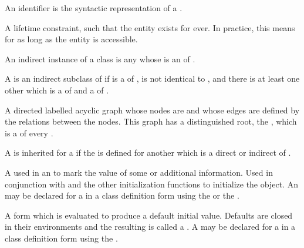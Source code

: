 \begin{optDefinition}
\begin{definitions}
     An identifier is the
    syntactic representation of a .

     A lifetime
    constraint, such that the entity exists for ever.  In practice, this means
    for as long as the entity is accessible.

     An indirect instance of a
    class  is any  whose  is an
      of .

     A  is an
    indirect subclass of  if  is a 
    of ,  is not identical to , and
    there is at least one other  which is a  of
     and a  of .

      A directed
    labelled acyclic graph whose nodes are  and whose edges are
    defined by the  relations between the nodes.  This
    graph has a distinguished root, the  , which is
    a  of every .

     A   is inherited for a
     if the   is defined for another
     which is a direct or indirect  of
    .

      A  used in an
     to mark the value of some  or additional
    information.  Used in conjunction with  and the other
     initialization functions to initialize the object.  An
     may be declared for a  in a class definition
    form using the   or the
     .

      A form which is evaluated to
    produce a default initial  value.  Defaults are closed in their
     environments and the resulting  is called a
    .  A  may be declared for a 
    in a class definition form using the 
    .


\end{definitions}
\end{optDefinition}
